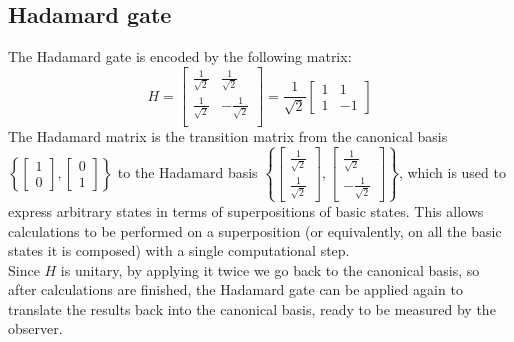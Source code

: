 \documentclass[12pt,a4paper]{report}
\theoremstyle{definition}
\theoremstyle{definition}
\theoremstyle{definition}
\begin{document}
\subsection{Hadamard gate}
The Hadamard gate is encoded by the following matrix:
\begin{equation*}
    H=\begin{bmatrix}
        \frac{1}{\sqrt{2}} & \frac{1}{\sqrt{2}} \\
        \frac{1}{\sqrt{2}} & -\frac{1}{\sqrt{2}} \\
    \end{bmatrix}=\frac{1}{\sqrt{2}}\begin{bmatrix}
        1 & 1 \\
        1 & -1
    \end{bmatrix}
\end{equation*}
The Hadamard matrix is the transition matrix from the canonical basis $\left\{\begin{bmatrix} 1 \\ 0\end{bmatrix}, \begin{bmatrix} 0 \\ 1\end{bmatrix}\right\}$ to the Hadamard basis $\left\{\begin{bmatrix} \frac{1}{\sqrt{2}} \\ \frac{1}{\sqrt{2}}\end{bmatrix}, \begin{bmatrix} \frac{1}{\sqrt{2}} \\ -\frac{1}{\sqrt{2}}\end{bmatrix}\right\}$, which is used to express arbitrary states in terms of superpositions of basic states. This allows calculations to be performed on a superposition (or equivalently, on all the basic states it is composed) with a single computational step.\\
Since $H$ is unitary, by applying it twice we go back to the canonical basis, so after calculations are finished, the Hadamard gate can be applied again to translate the results back into the canonical basis, ready to be measured by the observer.
\end{document}
